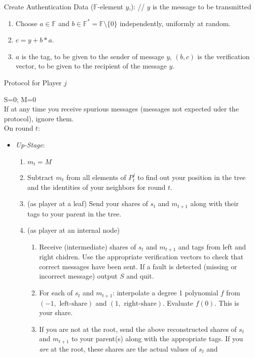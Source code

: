 \documentclass[12pt]{article}
\theoremstyle{definition}
\newcommand{\F}{\mathbb{F}}
\newcommand{\upStage}{\emph{Up-Stage}\xspace}
\begin{document}
\begin{algorithm}
\caption{Create Authentication Data ($\F$-element $y$,):   
// $y$ is the message to be transmitted} \label{alg:verification}
\begin{enumerate}
\item Choose $a \in \F$ and $b \in \F^* = \F\setminus\{0\}$ independently, 
uniformly at random.
\item $c = y + b*a$.
\item $a$ is the tag, to be given to the sender of message $y$, $(b,c)$ is the 
verification vector, to be given to the recipient of the message $y$.  
\end{enumerate}
\end{algorithm}

\begin{algorithm} 
\caption{Protocol for Player $j$} \label{alg:Player} 
S=0; M=0 \\
If at any time you receive spurious messages (messages not expected uder the 
protocol), ignore them. \\
On round $t$:
\begin{itemize}
\item[] \upStage:
\begin{enumerate}
\item $m_t = M$
\item Subtract $m_t$ from all elements of $P^j_t$ to find out your position 
in the tree and the identities of your neighbors for round $t$.
\item (as player at a leaf) Send your shares of $s_t$ and $m_{t+1}$ along with 
their tags to your parent in the tree.
\item (as player at an internal node) 
\begin{enumerate}
\item Receive (intermediate) shares of $s_t$ and $m_{t+1}$ and tags from 
left and right chidren. Use the 
appropriate verification vectors to check that correct messages have been sent.
If a fault is detected (missing or incorrect message) output $S$ and quit.
\item For each of $s_t$ and $m_{t+1}$: interpolate a degree 1 polynomial $f$ 
from $(-1, \mbox{ left-share})$ and $(1, \mbox{ right-share})$. 
Evaluate $f(0)$. This is your share.
\item If you are not at the root, send the above reconstructed shares of $s_t$ 
and $m_{t+1}$ to your parent(s) along with the appropriate tags. If you 
\emph{are} at the root, these shares are the actual values of $s_t$ and 

\end{enumerate}
\end{enumerate}
\end{itemize}
\end{algorithm}
\end{document}
